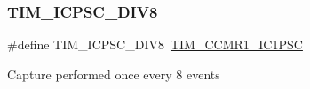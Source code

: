 \subsubsection{\texorpdfstring{T\+I\+M\+\_\+\+I\+C\+P\+S\+C\+\_\+\+D\+I\+V8}{TIM\_ICPSC\_DIV8}}
{\footnotesize\ttfamily \#define T\+I\+M\+\_\+\+I\+C\+P\+S\+C\+\_\+\+D\+I\+V8~\hyperlink{group___peripheral___registers___bits___definition_gab46b7186665f5308cd2ca52acfb63e72}{T\+I\+M\+\_\+\+C\+C\+M\+R1\+\_\+\+I\+C1\+P\+SC}}

Capture performed once every 8 events 
